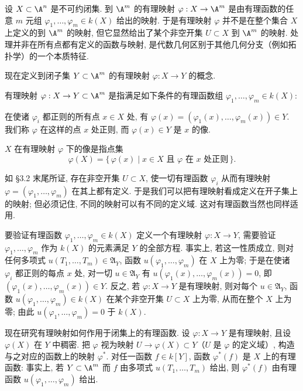 设 $X \subset \A^n$ 是不可约闭集. 到 $\A^m$ 的有理映射 $\varphi: X \to \A^m$ 是由有理函数的任意 $m$ 元组 $\varphi_1, \ldots, \varphi_m \in k(X)$ 给出的映射. 于是有理映射 $\varphi$ 并不是在整个集合 $X$ 上定义的到 $\A^m$ 的映射, 但它显然给出了某个非空开集 $U \subset X$ 到 $\A^m$ 的映射. 处理并非在所有点都有定义的函数与映射, 是代数几何区别于其他几何分支（例如拓扑学）的一个本质特征.

现在定义到闭子集 $Y \subset \A^m$ 的有理映射 $\varphi: X \to Y$ 的概念.

\begin{definition}[有理映射]\label{def:rational-map-affine}
	有理映射 $\varphi: X \to Y \subset \A^m$ 是指满足如下条件的有理函数组 $\varphi_1, \ldots, \varphi_m \in k(X)$:

	在使诸 $\varphi_i$ 都正则的所有点 $x \in X$ 处, 有 $\varphi(x) = (\varphi_1(x), \ldots, \varphi_m(x)) \in Y$. 我们称 $\varphi$ 在这样的点 $x$ 处正则, 而 $\varphi(x) \in Y$ 是 $x$ 的像.

	$X$ 在有理映射 $\varphi$ 下的像是指点集
	\[
		\varphi(X) = \{\, \varphi(x) \mid x \in X \text{ 且 } \varphi \text{ 在 } x \text{ 处正则} \,\}.
	\]
\end{definition}

如 §3.2 末尾所证, 存在非空开集 $U \subset X$, 使一切有理函数 $\varphi_i$ 从而有理映射 $\varphi = (\varphi_1, \ldots, \varphi_m)$ 在其上都有定义. 于是我们可以把有理映射看成定义在开子集上的映射; 但必须记住, 不同的映射可以有不同的定义域. 这对有理函数当然也同样适用.

要验证有理函数 $\varphi_1, \ldots, \varphi_m \in k(X)$ 定义一个有理映射 $\varphi: X \to Y$, 需要验证 $\varphi_1, \ldots, \varphi_m$ 作为 $k(X)$ 的元素满足 $Y$ 的全部方程. 事实上, 若这一性质成立, 则对任何多项式 $u(T_1, \ldots, T_m) \in \mathfrak A_Y$, 函数 $u(\varphi_1, \ldots, \varphi_m)$ 在 $X$ 上为零; 于是在使诸 $\varphi_i$ 都正则的每点 $x$ 处, 对一切 $u \in \mathfrak A_Y$ 有 $u(\varphi_1(x), \ldots, \varphi_m(x)) = 0$, 即 $(\varphi_1(x), \ldots, \varphi_m(x)) \in Y$. 反之, 若 $\varphi: X \to Y$ 是有理映射, 则对每个 $u \in \mathfrak A_Y$, 函数 $u(\varphi_1, \ldots, \varphi_m) \in k(X)$ 在某个非空开集 $U \subset X$ 上为零, 从而在整个 $X$ 上为零; 由此 $u(\varphi_1, \ldots, \varphi_m) = 0$ 于 $k(X)$.

现在研究有理映射如何作用于闭集上的有理函数. 设 $\varphi: X \to Y$ 是有理映射, 且设 $\varphi(X)$ 在 $Y$ 中稠密. 把 $\varphi$ 视为映射 $U \to \varphi(X) \subset Y$（$U$ 是 $\varphi$ 的定义域）, 构造与之对应的函数上的映射 $\varphi^*$. 对任一函数 $f \in k[Y]$, 函数 $\varphi^*(f)$ 是 $X$ 上的有理函数: 事实上, 若 $Y \subset \A^m$ 而 $f$ 由多项式 $u(T_1, \ldots, T_m)$ 给出, 则 $\varphi^*(f)$ 由有理函数 $u(\varphi_1, \ldots, \varphi_m)$ 给出.

